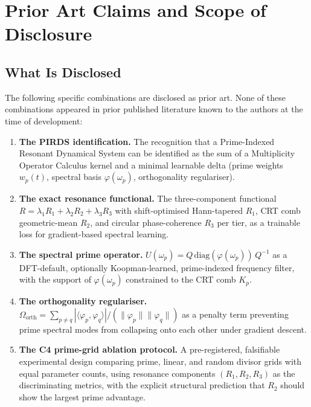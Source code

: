 \documentclass[11pt,a4paper]{article}
\theoremstyle{plain}
\theoremstyle{definition}
\theoremstyle{remark}
\begin{document}
\section{Prior Art Claims and Scope of Disclosure}

\subsection{What Is Disclosed}

The following specific combinations are disclosed as prior art. None of these combinations
appeared in prior published literature known to the authors at the time of development:

\begin{enumerate}[leftmargin=1.5em,itemsep=4pt]
  \item \textbf{The PIRDS identification.} The recognition that a Prime-Indexed Resonant
    Dynamical System can be identified as the sum of a Multiplicity Operator Calculus kernel
    and a minimal learnable delta (prime weights $w_p(t)$, spectral basis $\varphi(\omega_p)$,
    orthogonality regulariser).

  \item \textbf{The exact resonance functional.} The three-component functional
    $R = \lambda_1 R_1 + \lambda_2 R_2 + \lambda_3 R_3$ with shift-optimised Hann-tapered
    $R_1$, CRT comb geometric-mean $R_2$, and circular phase-coherence $R_3$ per tier,
    as a trainable loss for gradient-based spectral learning.

  \item \textbf{The spectral prime operator.} $U(\omega_p) = Q\,\mathrm{diag}(\varphi(\omega_p))\,Q^{-1}$
    as a DFT-default, optionally Koopman-learned, prime-indexed frequency filter, with the
    support of $\varphi(\omega_p)$ constrained to the CRT comb $K_p$.

  \item \textbf{The orthogonality regulariser.} $\Omega_\mathrm{orth} = \sum_{p \neq q}
    |\langle\varphi_p, \varphi_q\rangle| / (\|\varphi_p\|\|\varphi_q\|)$ as a penalty
    term preventing prime spectral modes from collapsing onto each other under gradient descent.

  \item \textbf{The C4 prime-grid ablation protocol.} A pre-registered, falsifiable experimental
    design comparing prime, linear, and random divisor grids with equal parameter counts,
    using resonance components $(R_1, R_2, R_3)$ as the discriminating metrics, with the
    explicit structural prediction that $R_2$ should show the largest prime advantage.


\end{enumerate}
\end{document}

